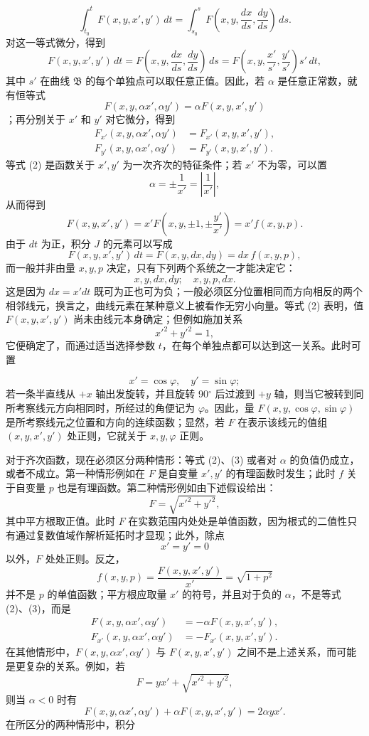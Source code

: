 \documentclass[11pt,a4paper,leqno]{article}
\begin{document}
\[
 \int_{t_0}^{t}F(x,y,x',y')\,dt
 =\int_{s_0}^{s}F\left(x,y,\frac{dx}{ds},\frac{dy}{ds}\right)\,ds.
\]
对这一等式微分，得到
\[
 F(x,y,x',y')\,dt
 =F\left(x,y,\frac{dx}{ds},\frac{dy}{ds}\right)\,ds
 =F\left(x,y,\frac{x'}{s'},\frac{y'}{s'}\right)s'\,dt,
\]
其中 $s'$ 在曲线 $\mathfrak{B}$ 的每个单独点可以取任意正值。因此，若 $\alpha$ 是任意正常数，就有恒等式
\begin{equation}\tag{2}
 F(x,y,\alpha x',\alpha y')=\alpha F(x,y,x',y')
\end{equation}
；再分别关于 $x'$ 和 $y'$ 对它微分，得到
\begin{equation}\tag{3}
\begin{aligned}
 F_{x'}(x,y,\alpha x',\alpha y')&=F_{x'}(x,y,x',y'),\\
 F_{y'}(x,y,\alpha x',\alpha y')&=F_{y'}(x,y,x',y').
\end{aligned}
\end{equation}
等式 (2) 是函数关于 $x',y'$ 为一次齐次的特征条件；若 $x'$ 不为零，可以置
\[
 \alpha=\pm\frac{1}{x'}=\left|\frac{1}{x'}\right|,
\]
从而得到
\[
 F(x,y,x',y')=x'F\left(x,y,\pm1,\pm\frac{y'}{x'}\right)=x'f(x,y,p).
\]
由于 $dt$ 为正，积分 $J$ 的元素可以写成
\[
 F(x,y,x',y')\,dt=F(x,y,dx,dy)=dx\,f(x,y,p),
\]
而一般并非由量 $x,y,p$ 决定，只有下列两个系统之一才能决定它：
\[
 x,y,dx,dy;\quad x,y,p,dx.
\]
这是因为 $dx=x'dt$ 既可为正也可为负；一般必须区分位置相同而方向相反的两个相邻线元，换言之，曲线元素在某种意义上被看作无穷小向量。等式 (2) 表明，值 $F(x,y,x',y')$ 尚未由线元本身确定；但例如施加关系
\[
 x'^2+y'^2=1,
\]
它便确定了，而通过适当选择参数 $t$，在每个单独点都可以达到这一关系。此时可置

\[
 x'=\cos\varphi,\quad y'=\sin\varphi;
\]
若一条半直线从 $+x$ 轴出发旋转，并且旋转 90$^\circ$ 后过渡到 $+y$ 轴，则当它被转到同所考察线元方向相同时，所经过的角便记为 $\varphi$。因此，量 $F(x,y,\cos\varphi,\sin\varphi)$ 是所考察线元之位置和方向的连续函数；显然，若 $F$ 在表示该线元的值组 $(x,y,x',y')$ 处正则，它就关于 $x,y,\varphi$ 正则。

对于齐次函数，现在必须区分两种情形：等式 (2)、(3) 或者对 $\alpha$ 的负值仍成立，或者不成立。第一种情形例如在 $F$ 是自变量 $x',y'$ 的有理函数时发生；此时 $f$ 关于自变量 $p$ 也是有理函数。第二种情形例如由下述假设给出：
\[
 F=\sqrt{x'^2+y'^2},
\]
其中平方根取正值。此时 $F$ 在实数范围内处处是单值函数，因为根式的二值性只有通过复数值域作解析延拓时才显现；此外，除点
\[
 x'=y'=0
\]
以外，$F$ 处处正则。反之，
\[
 f(x,y,p)=\frac{F(x,y,x',y')}{x'}=\sqrt{1+p^2}
\]
并不是 $p$ 的单值函数；平方根应取量 $x'$ 的符号，并且对于负的 $\alpha$，不是等式 (2)、(3)，而是
\[
\begin{aligned}
 F(x,y,\alpha x',\alpha y')&=-\alpha F(x,y,x',y'),\\
 F_{x'}(x,y,\alpha x',\alpha y')&=-F_{x'}(x,y,x',y').
\end{aligned}
\]
在其他情形中，$F(x,y,\alpha x',\alpha y')$ 与 $F(x,y,x',y')$ 之间不是上述关系，而可能是更复杂的关系。例如，若
\[
 F=yx'+\sqrt{x'^2+y'^2},
\]
则当 $\alpha<0$ 时有
\[
 F(x,y,\alpha x',\alpha y')+\alpha F(x,y,x',y')=2\alpha yx'.
\]
在所区分的两种情形中，积分
\end{document}
